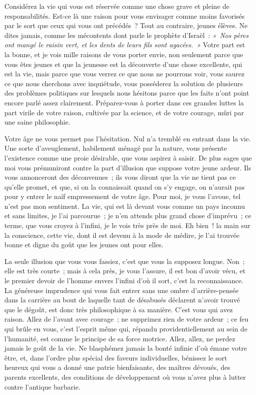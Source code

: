 \documentclass[french,twoside]{book} %
\newcommand\persName[1]{#1}
\begin{document}
Considérez la vie qui vous est réservée comme une chose grave et pleine de responsabilités. Est-ce là une raison pour vous envisager comme moins favorisés par le sort que ceux qui vous ont précédés ? Tout au contraire, jeunes élèves. Ne dites jamais, comme les mécontents dont parle le {\persName prophète d’Israël} : \emph{« Nos pères ont mangé le raisin vert, et les dents de leurs fils sont agacées. »} Votre part est la bonne, et je vois mille raisons de vous porter envie, non seulement parce que vous êtes jeunes et que la jeunesse est la découverte d’une chose excellente, qui est la vie, mais parce que vous verrez ce que nous ne pourrons voir, vous saurez ce que nous cherchons avec inquiétude, vous posséderez la solution de plusieurs des problèmes politiques sur lesquels nous hésitons parce que les faits n’ont point encore parlé assez clairement. Préparez-vous à porter dans ces grandes luttes la part virile de votre raison, cultivée par la science, et de votre courage, mûri par une saine philosophie.\par
Votre âge ne vous permet pas l’hésitation. Nul n’a tremblé en entrant dans la vie. Une sorte d’aveuglement, habilement ménagé par la nature, vous présente l’existence comme une proie désirable, que vous aspirez à saisir. De plus sages que moi vous prémuniront contre la part d’illusion que suppose votre jeune ardeur. Ils vous annonceront des déconvenues ; ils vous diront que la vie ne tient pas ce qu’elle promet, et que, si on la connaissait quand on s’y engage, on n’aurait pas pour y entrer le naïf empressement de votre âge. Pour moi, je vous l’avoue, tel n’est pas mon sentiment. La vie, qui est là devant vous comme un pays inconnu et sans limites, je l’ai parcourue ; je n’en attends plus grand chose d’imprévu ; ce terme, que vous croyez à l’infini, je le vois très près de moi. Eh bien ! la main sur la conscience, cette vie, dont il est devenu à la mode de médire, je l’ai trouvée bonne et digne du goût que les jeunes ont pour elles.\par
La seule illusion que vous vous fassiez, c’est que vous la supposez longue. Non ; elle est très courte ; mais à cela près, je vous l’assure, il est bon d’avoir vécu, et le premier devoir de l’homme envers l’infini d’où il sort, c’est la reconnaissance. La généreuse imprudence qui vous fait entrer sans une ombre d’arrière-pensée dans la carrière au bout de laquelle tant de désabusés déclarent n’avoir trouvé que le dégoût, est donc très philosophique à sa manière. C’est vous qui avez raison. Allez de l’avant avec courage ; ne supprimez rien de votre ardeur ; ce feu qui brûle en vous, c’est l’esprit même qui, répandu providentiellement au sein de l’humanité, est comme le principe de sa force motrice. Allez, allez, ne perdez jamais le goût de la vie. Ne blasphémez jamais la bonté infinie d’où émane votre être, et, dans l’ordre plus spécial des faveurs individuelles, bénissez le sort heureux qui vous a donné une patrie bienfaisante, des maîtres dévoués, des parents excellents, des conditions de développement où vous n’avez plus à lutter contre l’antique barbarie.\par
\end{document}
